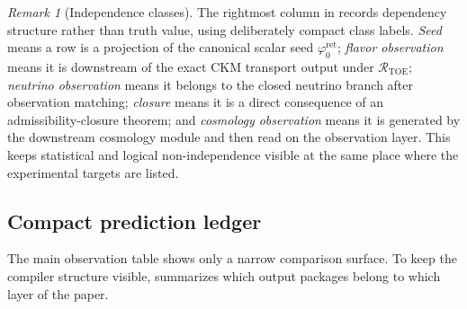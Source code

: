 \documentclass[11pt,a4paper]{article}
\theoremstyle{definition}
\theoremstyle{remark}
\newtheorem*{remark}{Remark}
\newcommand{\phiz}{\varphi_0^{\mathrm{ret}}}
\begin{document}
\begin{table}[t]
{\begin{tabular}
\bottomrule
\end{tabular}}
\caption{Operational prediction set with explicit status and dependency classes.}
\label{tab:operational-prediction-set}
\end{table}

\begin{remark}[Independence classes]
The rightmost column in  records dependency structure
rather than truth value, using deliberately compact class labels. \emph{Seed} means a row is a
projection of the canonical scalar seed $\phiz$; \emph{flavor observation} means it is
downstream of the exact CKM transport output under $\mathcal R_{\mathrm{TOE}}$; \emph{neutrino
observation} means it belongs to the closed neutrino branch after observation matching;
\emph{closure} means it is a direct consequence of an admissibility-closure theorem; and
\emph{cosmology observation} means it is generated by the downstream cosmology module and then
read on the observation layer. This keeps statistical and logical non-independence visible at the same place
where the experimental targets are listed.
\end{remark}

\subsection{Compact prediction ledger}

The main observation table shows only a narrow comparison surface. To keep the compiler
structure visible,  summarizes which output packages belong to which
layer of the paper.
\end{document}
